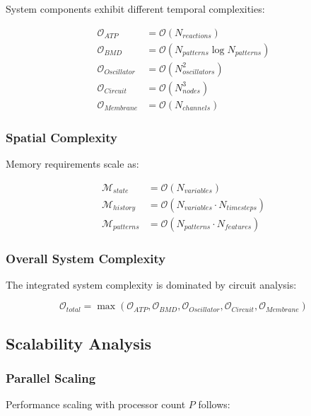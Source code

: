 \documentclass[12pt,a4paper]{article}
\begin{document}
System components exhibit different temporal complexities:

\begin{align}
\mathcal{O}_{ATP} &= \mathcal{O}(N_{reactions}) \\
\mathcal{O}_{BMD} &= \mathcal{O}(N_{patterns} \log N_{patterns}) \\
\mathcal{O}_{Oscillator} &= \mathcal{O}(N_{oscillators}^2) \\
\mathcal{O}_{Circuit} &= \mathcal{O}(N_{nodes}^3) \\
\mathcal{O}_{Membrane} &= \mathcal{O}(N_{channels})
\end{align}

\subsubsection{Spatial Complexity}

Memory requirements scale as:

\begin{align}
\mathcal{M}_{state} &= \mathcal{O}(N_{variables}) \\
\mathcal{M}_{history} &= \mathcal{O}(N_{variables} \cdot N_{timesteps}) \\
\mathcal{M}_{patterns} &= \mathcal{O}(N_{patterns} \cdot N_{features})
\end{align}

\subsubsection{Overall System Complexity}

The integrated system complexity is dominated by circuit analysis:

\begin{equation}
\mathcal{O}_{total} = \max(\mathcal{O}_{ATP}, \mathcal{O}_{BMD}, \mathcal{O}_{Oscillator}, \mathcal{O}_{Circuit}, \mathcal{O}_{Membrane})
\end{equation}

\subsection{Scalability Analysis}

\subsubsection{Parallel Scaling}

Performance scaling with processor count $P$ follows:
\end{document}

